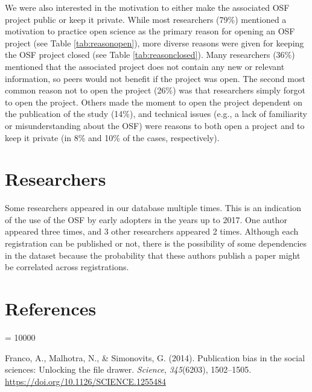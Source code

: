 \documentclass[
  ,jou, a4paper,floatsintext]{apa6}
\newlength{\cslhangindent}
\newlength{\cslentryspacingunit} %
\newenvironment{CSLReferences}[2] %
 {%
  \setlength{\parindent}{0pt}
  \ifodd #1
  \let\oldpar\par
  \def\par{\hangindent=\cslhangindent\oldpar}
  \fi
  \setlength{\parskip}{#2\cslentryspacingunit}
 }%
 {}
\begin{document}
We were also interested in the motivation to either make the associated OSF project public or keep it private. While most researchers (79\%) mentioned a motivation to practice open science as the primary reason for opening an OSF project (see Table \ref{tab:reasonopen}), more diverse reasons were given for keeping the OSF project closed (see Table \ref{tab:reasonclosed}). Many researchers (36\%) mentioned that the associated project does not contain any new or relevant information, so peers would not benefit if the project was open. The second most common reason not to open the project (26\%) was that researchers simply forgot to open the project. Others made the moment to open the project dependent on the publication of the study (14\%), and technical issues (e.g., a lack of familiarity or misunderstanding about the OSF) were reasons to both open a project and to keep it private (in 8\% and 10\% of the cases, respectively).

\hypertarget{researchers}{%
\section{Researchers}\label{researchers}}

Some researchers appeared in our database multiple times. This is an indication of the use of the OSF by early adopters in the years up to 2017. One author appeared three times, and 3 other researchers appeared 2 times. Although each registration can be published or not, there is the possibility of some dependencies in the dataset because the probability that these authors publish a paper might be correlated across registrations.

\hypertarget{references}{%
\section{References}\label{references}}

\begingroup

\interlinepenalty = 10000

\hypertarget{refs}{}
\begin{CSLReferences}{1}{0}
\leavevmode{}%
Franco, A., Malhotra, N., \& Simonovits, G. (2014). Publication bias in the social sciences: {Unlocking} the file drawer. \emph{Science}, \emph{345}(6203), 1502--1505. \url{https://doi.org/10.1126/SCIENCE.1255484}

\end{CSLReferences}

\endgroup
\end{document}

